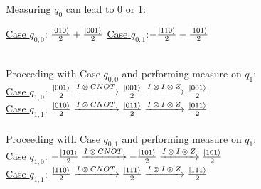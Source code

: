 \documentclass[a4paper,12pt]{article}
\begin{document}
    \begin{center}
        Measuring $q_{0}$ can lead to 0 or 1: \\
    \end{center}
    \hspace{25mm}\underline{Case $q_{0,0}$}: $\frac{\ket{010}}{2}+\frac{\ket{001}}{2}$ \hspace{50mm} \underline{Case $q_{0,1}$}:$-\frac{\ket{110}}{2} -\frac{\ket{101}}{2}$ \\~\\
    \begin{center}
        Proceeding with Case $q_{0,0}$ and performing measure on $q_{1}$: \\
    \underline{Case $q_{1,0}$}:  $\frac{\ket{001}}{2} \xrightarrow[]{\text{$I \otimes CNOT$}} \frac{\ket{001}}{2} \xrightarrow[]{\text{$I \otimes I \otimes Z$}}
    \frac{\ket{001}}{2}$ \\
    \underline{Case $q_{1,1}$}: $\frac{\ket{010}}{2}\xrightarrow[]{\text{$I \otimes CNOT$}} \frac{\ket{011}}{2}\xrightarrow[]{\text{$I \otimes I \otimes Z$}} \frac{\ket{011}}{2}$ \\~\\
    Proceeding with Case $q_{0,1}$ and performing measure on $q_{1}$: \\
    \underline{Case $q_{1,0}$}: $-\frac{\ket{101}}{2}\xrightarrow[]{\text{$I \otimes CNOT$}} -\frac{\ket{101}}{2}\xrightarrow[]{\text{$I \otimes I \otimes Z$}} \frac{\ket{101}}{2}$ \\
    \underline{Case $q_{1,1}$}: $\frac{\ket{110}}{2}\xrightarrow[]{\text{$I \otimes CNOT$}} \frac{\ket{111}}{2} \xrightarrow[]{\text{$I \otimes I \otimes Z$}}\frac{\ket{111}}{2}$
    \end{center}

    
\end{document}
